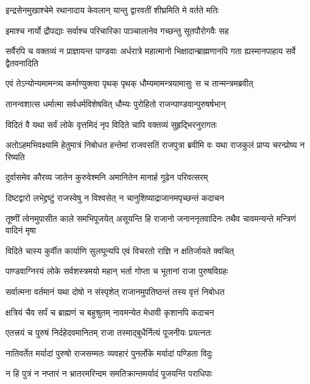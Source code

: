 \twolineshloka
{इन्द्रसेनमुखाश्चेमे रथानादाय केवलान्}
{यान्तु द्वारवतीं शीघ्रमिति मे वर्तते मतिः}


\twolineshloka
{इमाश्च नार्यो द्रौपद्याः सर्वाश्च परिचारिका}
{पाञ्चालानेव गच्छन्तु सूतपौरोगवैः सह}


\threelineshloka
{सर्वैरपि च वक्तव्यं न प्राज्ञायन्त पाण्डवाः}
{अर्धरात्रे महात्मानो भिक्षादान्ब्राह्मणानपि}
{गता ह्यस्मानपाहाय सर्वे द्वैतवनादिति}



\twolineshloka
{एवं तेऽन्योन्यमामन्त्र्य कर्माण्युक्त्वा पृथक् पृथक्}
{धौम्यमामन्त्रयामासुः स च तान्मन्त्रमब्रवीत्}


\twolineshloka
{तानन्वशात्स धर्मात्मा सर्वधर्मविशेषवित्}
{धौम्यः पुरोहितो राजन्पाण्डवान्पुरुषर्षभान्}




\twolineshloka
{विदितं वै यथा सर्वं लोके वृत्तमिदं नृप}
{विदिते चापि वक्तव्यं सुहृद्भिरनुरागतः}


\threelineshloka
{अतोऽहमभिवक्ष्यामि हेतुमात्रं निबोधत}
{हन्तेमां राजवसतिं राजपुत्रा ब्रवीमि वः}
{यथा राजकुलं प्राप्य चरन्प्रोष्य न रिष्यति}


\twolineshloka
{दुर्वासमेव कौरव्य जातेन कुरुवेश्मनि}
{अमानितेन मानार्ह गूढेन परिवत्सरम्}


\twolineshloka
{दिष्टद्वारो लभेद्द्रष्टुं राजस्वेषु न विश्वसेत्}
{न चानुशिष्याद्राजानमपृच्छन्तं कदाचन}


\onelineshloka
{तूष्णीं त्वेनमुपासीत काले समभिपूजयेत्}
\twolineshloka
{असूयन्ति हि राजानो जनाननृतवादिनः}
{तथैव चावमन्यन्ते मन्त्रिणं वादिनं मृषा}


\twolineshloka
{विदिते चास्य कुर्वीत कार्याणि सुलघून्यपि}
{एवं विचरतो राज्ञि न क्षतिर्जायते क्वचित्}


\twolineshloka
{पाण्डवाग्निरयं लोके सर्वशस्त्रमयो महान्}
{भर्ता गोप्ता च भूतानां राजा पुरुषविग्रहः}


\twolineshloka
{सर्वात्मना वर्तमानं यथा दोषो न संस्पृशेत्}
{राजानमुपतिष्ठन्तं तस्य वृत्तं निबोधत}


\twolineshloka
{क्षत्रियं चैव सर्पं च ब्राह्मणं च बहुश्रुतम्}
{नावमन्येत मेधावी कृशानपि कदाचन}


\twolineshloka
{एतत्त्रयं च पुरुषं निर्दहेदवमानितम्}
{राजा तस्माद्बुधैर्नित्यं पूजनीयः प्रयत्नतः}


\twolineshloka
{नातिवर्तेत मर्यादां पुरुषो राजसम्मतः}
{व्यवहारं पुनर्लोके मर्यादां पण्डिता विदुः}


\twolineshloka
{न हि पुत्रं न नप्तारं न भ्रातरमरिन्दम}
{समतिक्रान्तमर्यादं पूजयन्ति पराधिपाः}


